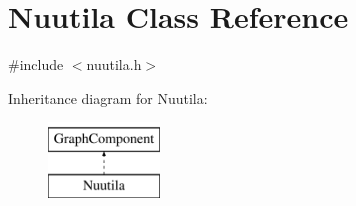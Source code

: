 \hypertarget{class_nuutila}{}\section{Nuutila Class Reference}
\label{class_nuutila}


{\ttfamily \#include $<$nuutila.\+h$>$}

Inheritance diagram for Nuutila\+:\begin{figure}[H]
\begin{center}
\leavevmode
\includegraphics[height=2.000000cm]{class_nuutila}
\end{center}
\end{figure}
